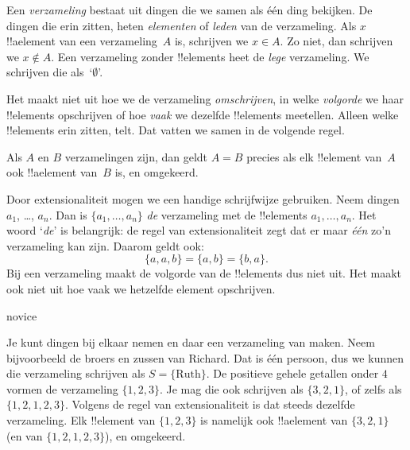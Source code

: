 \documentclass[../../../include/open-logic-section]{subfiles}
\begin{document}

Een \emph{verzameling} bestaat uit dingen die we samen als één ding
bekijken. De dingen die erin zitten, heten \emph{elementen} of
\emph{leden} van de verzameling. Als $x$ !!a{element} van een
verzameling~$A$ is, schrijven we $x \in A$. Zo niet, dan schrijven we
$x \notin A$. Een verzameling zonder !!{element}s heet de
\emph{lege} verzameling. We schrijven die als~‘$\emptyset$’.

\begin{explain}
Het maakt niet uit hoe we de verzameling \emph{omschrijven}, in welke
\emph{volgorde} we haar !!{element}s opschrijven of hoe \emph{vaak}
we dezelfde !!{element}s meetellen. Alleen welke !!{element}s erin
zitten, telt. Dat
vatten we samen in de volgende regel.
\end{explain}

\begin{defn}[Extensionaliteit]
  Als $A$ en $B$ verzamelingen zijn, dan geldt $A = B$ precies als elk
  !!{element} van~$A$ ook !!a{element} van~$B$ is, en omgekeerd.
\end{defn}

Door extensionaliteit mogen we een handige schrijfwijze gebruiken.
Neem dingen $a_{1}$, \dots, $a_{n}$. Dan is
$\{a_{1}, \dots, a_{n}\}$ \emph{de} verzameling met de !!{element}s
$a_1, \ldots, a_n$. Het woord ‘\emph{de}’ is belangrijk: de regel van
extensionaliteit zegt dat er maar \emph{één} zo'n verzameling kan
zijn. Daarom geldt ook:
  \[
    \{a, a, b\} = \{a, b\} = \{b,a\}.
  \] 
Bij een verzameling maakt de volgorde van de !!{element}s dus niet
uit. Het maakt ook niet uit hoe vaak we hetzelfde element opschrijven.

\begin{tagblock}{novice}
\begin{ex}
Je kunt dingen bij elkaar nemen en daar een verzameling van maken.
Neem bijvoorbeeld de broers en zussen van Richard. Dat is één
persoon, dus we kunnen die verzameling schrijven als
$S=\{\textrm{Ruth}\}$. De positieve gehele getallen onder $4$ vormen
de verzameling $\{1, 2, 3\}$. Je mag die ook schrijven als
$\{3, 2, 1\}$, of zelfs als $\{1, 2, 1, 2, 3\}$. Volgens de regel van
extensionaliteit is dat steeds dezelfde verzameling. Elk !!{element}
van $\{1, 2, 3\}$ is namelijk ook !!a{element} van $\{3, 2, 1\}$ (en
van $\{1, 2, 1, 2, 3\}$), en omgekeerd.
\end{ex} 
\end{tagblock}
\end{document}
